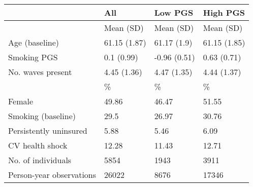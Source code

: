 % 
\begin{tabular}{llll}
  \toprule
\textbf{ } & \textbf{ All } & \textbf{ Low PGS } & \textbf{ High PGS } \\ 
  \midrule
 & Mean (SD) & Mean (SD) & Mean (SD) \\ 
   \midrule
Age (baseline) & 61.15 (1.87) & 61.17 (1.9) & 61.15 (1.85) \\ 
  Smoking PGS & 0.1 (0.99) & -0.96 (0.51) & 0.63 (0.71) \\ 
  No. waves present & 4.45 (1.36) & 4.47 (1.35) & 4.44 (1.37) \\ 
   & \% & \% & \% \\ 
  Female & 49.86 & 46.47 & 51.55 \\ 
  Smoking (baseline) & 29.5 & 26.97 & 30.76 \\ 
  Persistently uninsured & 5.88 & 5.46 & 6.09 \\ 
  CV health shock & 12.28 & 11.43 & 12.71 \\ 
   \midrule
No. of individuals & 5854 & 1943 & 3911 \\ 
   \midrule
Person-year observations & 26022 & 8676 & 17346 \\ 
  \end{tabular}
